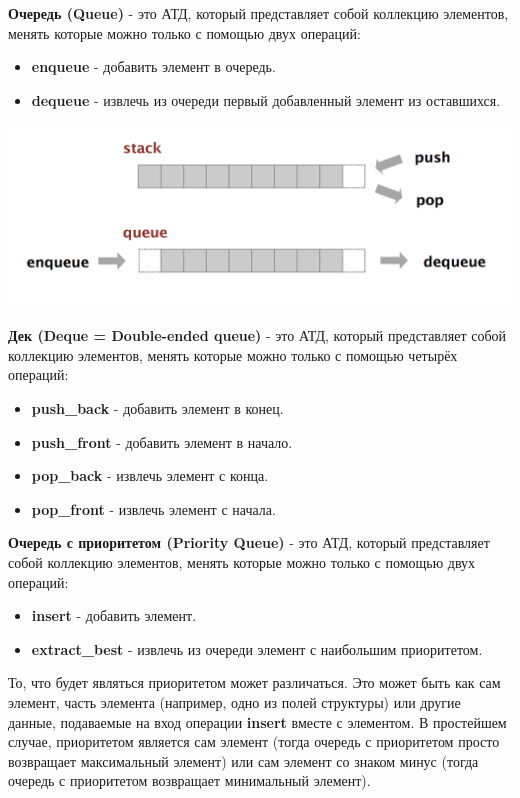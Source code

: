 \documentclass{article}
\begin{document}
\textbf{Очередь (Queue)} - это АТД, который представляет собой коллекцию элементов, менять которые можно только с помощью двух операций:
\begin{itemize}
\item \textbf{enqueue} - добавить элемент в очередь.
\item \textbf{dequeue} - извлечь из очереди первый добавленный элемент из оставшихся.
\end{itemize}

\begin{center}
\includegraphics[scale=0.46]{stack_queue.png}
\end{center}

\textbf{Дек (Deque = Double-ended queue)} - это АТД, который представляет собой коллекцию элементов, менять которые можно только с помощью четырёх операций:
\begin{itemize}
\item \textbf{push\_back} - добавить элемент в конец.
\item \textbf{push\_front} - добавить элемент в начало.
\item \textbf{pop\_back} - извлечь элемент с конца.
\item \textbf{pop\_front} - извлечь элемент с начала.\\
\end{itemize}

\textbf{Очередь с приоритетом (Priority Queue)} - это АТД, который представляет собой коллекцию элементов, менять которые можно только с помощью двух операций:
\begin{itemize}
\item \textbf{insert} - добавить элемент.
\item \textbf{extract\_best} - извлечь из очереди элемент с наибольшим приоритетом. 
\end{itemize}
То, что будет являться приоритетом может различаться. Это может быть как сам элемент, часть элемента (например, одно из полей структуры) или другие данные, подаваемые на вход операции \textbf{insert} вместе с элементом. В простейшем случае, приоритетом является сам элемент (тогда очередь с приоритетом просто возвращает максимальный элемент) или сам элемент со знаком минус (тогда очередь с приоритетом возвращает минимальный элемент).
\end{document}
